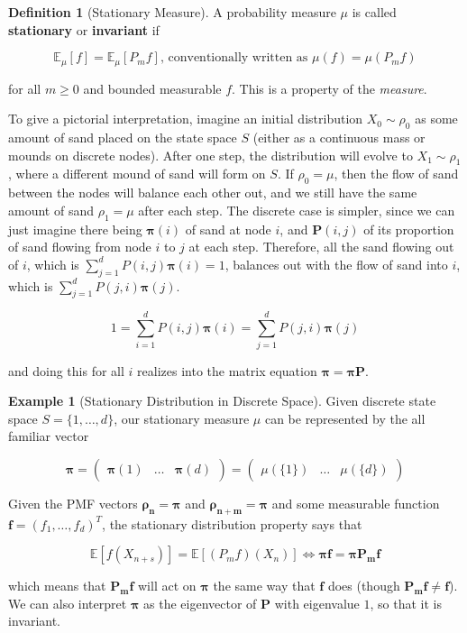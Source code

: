\documentclass{article}
\theoremstyle{definition}
\newtheorem{example}{Example}[section]
\theoremstyle{remark}
\theoremstyle{definition}
\newtheorem{definition}{Definition}[section]
\begin{document}
    \begin{definition}[Stationary Measure]
      A probability measure $\mu$ is called \textbf{stationary} or \textbf{invariant} if 

        \[\mathbb{E}_\mu[f] = \mathbb{E}_\mu [P_m f] \text{, conventionally written as } \mu(f) = \mu(P_m f)\]

      for all $m \geq 0$ and bounded measurable $f$. This is a property of the \textit{measure}. 
    \end{definition}

    To give a pictorial interpretation, imagine an initial distribution $X_0 \sim \rho_0$ as some amount of sand placed on the state space $S$ (either as a continuous mass or mounds on discrete nodes). After one step, the distribution will evolve to $X_1 \sim \rho_1$, where a different mound of sand will form on $S$. If $\rho_0 = \mu$, then the flow of sand between the nodes will balance each other out, and we still have the same amount of sand $\rho_1 = \mu$ after each step. The discrete case is simpler, since we can just imagine there being $\boldsymbol{\pi} (i)$ of sand at node $i$, and $\mathbf{P} (i, j)$ of its proportion of sand flowing from node $i$ to $j$ at each step. Therefore, all the sand flowing out of $i$, which is $\sum_{j=1}^d P(i, j) \boldsymbol{\pi}(i) = 1$, balances out with the flow of sand into $i$, which is $\sum_{j=1}^d P(j, i) \boldsymbol{\pi}(j)$. 

      \[1 = \sum_{i=1}^d P(i, j) \boldsymbol{\pi}(i) = \sum_{j=1}^d P(j, i) \boldsymbol{\pi}(j)\]

    and doing this for all $i$ realizes into the matrix equation $\boldsymbol{\pi} = \boldsymbol{\pi} \mathbf{P}$. 

    \begin{example}[Stationary Distribution in Discrete Space]
      Given discrete state space $S = \{1, \ldots, d\}$, our stationary measure $\mu$ can be represented by the all familiar vector 

        \[\boldsymbol{\pi} = \begin{pmatrix} \boldsymbol{\pi} (1) & \ldots & \boldsymbol{\pi} (d) \end{pmatrix} = \begin{pmatrix} \mu(\{1\}) & \ldots & \mu(\{d\}) \end{pmatrix}\] 

      Given the PMF vectors $\boldsymbol{\rho_n} = \boldsymbol{\pi}$ and $\boldsymbol{\rho_{n + m}} = \boldsymbol{\pi}$ and some measurable function $\mathbf{f} = (f_1, \ldots, f_d)^T$, the stationary distribution property says that 

        \[\mathbb{E}[f(X_{n + s})] = \mathbb{E}[(P_m f)(X_n)] \iff \boldsymbol{\pi} \mathbf{f} = \boldsymbol{\pi} \mathbf{P_m} \mathbf{f}\]

      which means that $\mathbf{P_m} \mathbf{f}$ will act on $\boldsymbol{\pi}$ the same way that $\mathbf{f}$ does (though $\mathbf{P_m} \mathbf{f} \neq \mathbf{f}$). We can also interpret $\boldsymbol{\pi}$ as the eigenvector of $\mathbf{P}$ with eigenvalue $1$, so that it is invariant. 
    \end{example}
\end{document}
